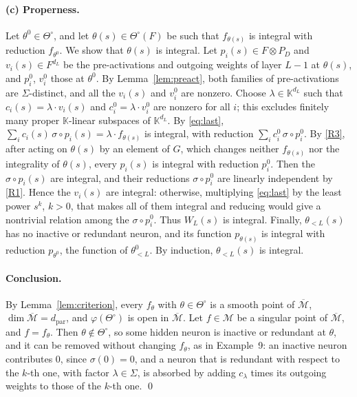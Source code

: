 \documentclass[11pt]{article}
\theoremstyle{definition}
\theoremstyle{remark}
\newcommand{\K}{\mathbb{K}}
\newcommand{\M}{\mathcal{M}}
\newcommand{\Mbar}{\overline{\M}}
\newcommand{\dpar}{d_{\mathrm{par}}}
\newcommand{\To}{\Theta^{\circ}}
\begin{document}
\paragraph{(c) Properness.} Let $\theta^0\in\To$, and let $\theta(s)\in\To(F)$ be such that $f_{\theta(s)}$ is integral with reduction $f_{\theta^0}$. We show that $\theta(s)$ is integral. Let $p_i(s)\in F\otimes P_D$ and $v_i(s)\in F^{d_L}$ be the pre-activations and outgoing weights of layer $L-1$ at $\theta(s)$, and $p_i^0$, $v_i^0$ those at $\theta^0$. By Lemma~\ref{lem:preact}, both families of pre-activations are $\Sigma$-distinct, and all the $v_i(s)$ and $v_i^0$ are nonzero. Choose $\lambda\in\K^{d_L}$ such that $c_i(s)=\lambda\cdot v_i(s)$ and $c_i^0=\lambda\cdot v_i^0$ are nonzero for all $i$; this excludes finitely many proper $\K$-linear subspaces of $\K^{d_L}$. By \eqref{eq:last}, $\sum_ic_i(s)\,\sigma\circ p_i(s)=\lambda\cdot f_{\theta(s)}$ is integral, with reduction $\sum_ic_i^0\,\sigma\circ p_i^0$. By \ref{R3}, after acting on $\theta(s)$ by an element of $G$, which changes neither $f_{\theta(s)}$ nor the integrality of $\theta(s)$, every $p_i(s)$ is integral with reduction $p_i^0$. Then the $\sigma\circ p_i(s)$ are integral, and their reductions $\sigma\circ p_i^0$ are linearly independent by \ref{R1}. Hence the $v_i(s)$ are integral: otherwise, multiplying \eqref{eq:last} by the least power $s^k$, $k>0$, that makes all of them integral and reducing would give a nontrivial relation among the $\sigma\circ p_i^0$. Thus $W_L(s)$ is integral. Finally, $\theta_{<L}(s)$ has no inactive or redundant neuron, and its function $p_{\theta(s)}$ is integral with reduction $p_{\theta^0}$, the function of $\theta^0_{<L}$. By induction, $\theta_{<L}(s)$ is integral.

\paragraph{Conclusion.} By Lemma~\ref{lem:criterion}, every $f_\theta$ with $\theta\in\To$ is a smooth point of $\Mbar$, $\dim\Mbar=\dpar$, and $\varphi(\To)$ is open in $\Mbar$. Let $f\in\M$ be a singular point of $\Mbar$, and $f=f_\theta$. Then $\theta\notin\To$, so some hidden neuron is inactive or redundant at $\theta$, and it can be removed without changing $f_\theta$, as in Example~9: an inactive neuron contributes $0$, since $\sigma(0)=0$, and a neuron that is redundant with respect to the $k$-th one, with factor $\lambda\in\Sigma$, is absorbed by adding $c_\lambda$ times its outgoing weights to those of the $k$-th one. \qed
\end{document}

